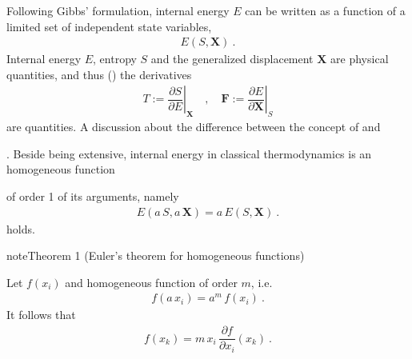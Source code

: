 \documentclass[letterpaper,10pt,english]{jupyterBook}
\begin{document}
\sphinxAtStartPar
Following Gibbs’ formulation, internal energy \(E\) can be written as a function of a limited set of independent state variables,
\begin{equation*}
\begin{split}E(S, \mathbf{X}) \ .\end{split}
\end{equation*}
\sphinxAtStartPar
Internal energy \(E\), entropy \(S\) and the generalized displacement \(\mathbf{X}\) are  physical quantities, and thus () the derivatives
\begin{equation*}
\begin{split}T := \left.\dfrac{\partial S}{\partial E}\right|_{\mathbf{X}} \quad , \quad \mathbf{F} := \left.\dfrac{\partial E}{\partial \mathbf{X}}\right|_S\end{split}
\end{equation*}
\sphinxAtStartPar
are  quantities. A discussion about the difference between the concept of  and %
\begin{footnote}[1]\sphinxAtStartFootnote
{}
%
\end{footnote}.
Beside being extensive, internal energy in classical thermodynamics is an homogeneous function%
\begin{footnote}[2]\sphinxAtStartFootnote
{}
%
\end{footnote} of order 1 of its arguments, namely
\begin{equation*}
\begin{split}E(a \, S, a \, \mathbf{X}) = a \, E(S, \mathbf{X}) \ .\end{split}
\end{equation*}
\sphinxAtStartPar
{} holds.
\label{ch/potentials:theorem-0}
\begin{sphinxadmonition}{note}{Theorem 1 (Euler’s theorem for homogeneous functions)}



\sphinxAtStartPar
Let \(f(x_i)\) and homogeneous function of order \(m\), i.e.
\begin{equation}\label{equation:ch/potentials:eq:homogeneous-fun:def}
\begin{split}f(a \, x_i) = a^m \, f(x_i) \ .\end{split}
\end{equation}
\sphinxAtStartPar
It follows that
\begin{equation*}
\begin{split}f(x_k) = m \, x_i \, \dfrac{\partial f}{\partial x_i}(x_k) \ .\end{split}
\end{equation*}\end{sphinxadmonition}
\end{document}
